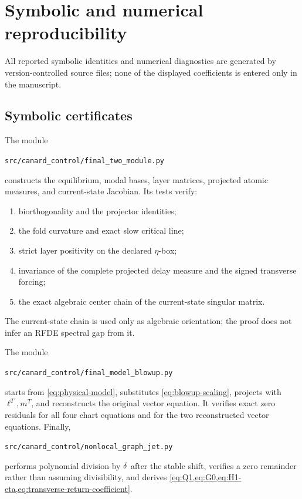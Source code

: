 \section{Symbolic and numerical reproducibility}
\label{app:reproducibility}

All reported symbolic identities and numerical diagnostics are generated by
version-controlled source files; none of the displayed coefficients is
entered only in the manuscript.

\subsection{Symbolic certificates}

The module
\begin{center}
\texttt{src/canard\_control/final\_two\_module.py}
\end{center}
constructs the equilibrium, modal bases, layer matrices, projected atomic
measures, and current-state Jacobian.  Its tests verify:
\begin{enumerate}[label=\textup{(\roman*)}]
\item biorthogonality and the projector identities;
\item the fold curvature and exact slow critical line;
\item strict layer positivity on the declared \(\eta\)-box;
\item invariance of the complete projected delay measure and the signed
transverse forcing;
\item the exact algebraic center chain of the current-state singular
matrix.
\end{enumerate}
The current-state chain is used only as algebraic orientation; the proof
does not infer an RFDE spectral gap from it.

The module
\begin{center}
\texttt{src/canard\_control/final\_model\_blowup.py}
\end{center}
starts from \cref{eq:physical-model}, substitutes
\cref{eq:blowup-scaling}, projects with \(\ell^T,m^T\), and reconstructs
the original vector equation.  It verifies exact zero residuals for all four
chart equations and for the two reconstructed vector equations.  Finally,
\begin{center}
\texttt{src/canard\_control/nonlocal\_graph\_jet.py}
\end{center}
performs polynomial division by \(\delta\) after the stable shift, verifies a
zero remainder rather than assuming divisibility, and derives
\cref{eq:Q1,eq:G0,eq:H1-eta,eq:transverse-return-coefficient}.

